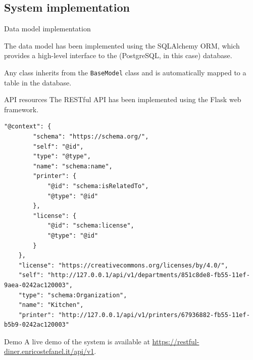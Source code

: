 \subsection[System implementation]{System implementation}

\begin{frame}[allowframebreaks]{Data model implementation}

	The data model has been implemented using the SQLAlchemy ORM, which
	provides a high-level interface to the (PostgreSQL, in this case) database.

	

	Any class inherits from the \texttt{BaseModel} class and is automatically
	mapped to a table in the database.

	\framebreak

	\vspace*{-1\baselineskip}
	

\end{frame}

\begin{frame}{API resources}
	The RESTful API has been implemented using the Flask web framework.

	

	\framebreak

	\begin{lstlisting}[caption={\texttt{GET /api/v1/departments/851c8de8-fb55-11ef-9aea-0242ac120003} response}]
	"@context": {
		"schema": "https://schema.org/",
		"self": "@id",
		"type": "@type",
		"name": "schema:name",
		"printer": {
			"@id": "schema:isRelatedTo",
			"@type": "@id"
		},
		"license": {
			"@id": "schema:license",
			"@type": "@id"
		}
	},
	"license": "https://creativecommons.org/licenses/by/4.0/",
	"self": "http://127.0.0.1/api/v1/departments/851c8de8-fb55-11ef-9aea-0242ac120003",
	"type": "schema:Organization",
	"name": "Kitchen",
	"printer": "http://127.0.0.1/api/v1/printers/67936882-fb55-11ef-b5b9-0242ac120003"\end{lstlisting}

\end{frame}

\begin{frame}{Demo}
	A live demo of the system is available at
	\url{https://restful-diner.enricostefanel.it/api/v1}.
\end{frame}


